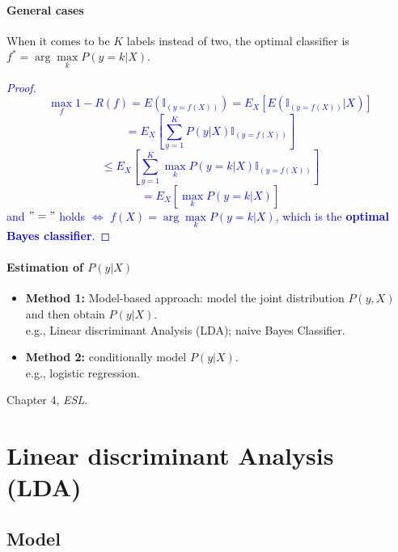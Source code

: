 \documentclass[12pt]{book}
\theoremstyle{definition}
\theoremstyle{remark}
\begin{document}
\paragraph{General cases} When it comes to be $K$ labels instead of two, the optimal classifier is $f^* = \arg\underset{k}{\max}P(y=k|X)$.\\
\textcolor{blue}{
\begin{proof}
 \[\underset{f}{\max} 1-R(f) = E(\mathbb{I}_{(y = f(X))}) = E_X[E(\mathbb{I}_{(y = f(X))}|X )] \]\[= E_X[\sum_{y=1}^K P(y|X)\mathbb{I}_{(y=f(X))}]\]   
 \[ \le E_X[\sum_{y=1}^K \underset{k}{\max}P(y = k|X)\mathbb{I}_{(y=f(X))}]\]
 \[ = E_X[\underset{k}{\max}P(y= k|X)]\]
 and $" = "$ holds $\iff$ $f(X) = \arg\underset{k}{\max}P(y = k|X)$, which is the \textbf{optimal Bayes classifier}.
\end{proof}
}




\paragraph{Estimation of $P(y|X)$}
\begin{itemize}
    \item \textbf{Method 1:} Model-based approach: model the joint distribution $P(y,X)$ and then obtain $P(y|X)$.\\
    e.g., Linear discriminant Analysis (LDA); naive Bayes Classifier.
    \item \textbf{Method 2:} conditionally model $P(y|X)$.\\
    e.g., logistic regression.
\end{itemize}

\begin{referencebox}
    Chapter 4, \textit{ESL}.
\end{referencebox}

\newpage
\section{Linear discriminant Analysis (LDA)}
\subsection{Model}
\end{document}
